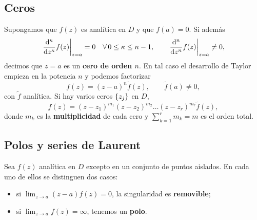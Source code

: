 \subsection{Ceros}
\label{subsec:ceros}

Supongamos que $f(z)$ es anal\'itica en $D$ y que $f(a)=0$. Si adem\'as
\begin{equation}
  \label{eq:cero_orden_n}
  \left. \frac{\mathrm{d}^{\kappa}}{\mathrm{d}z^{\kappa}}f(z) \right|_{z=a}=0
  \quad\forall\,0\le\kappa\le n-1,
  \qquad
  \left. \frac{\mathrm{d}^{n}}{\mathrm{d}z^{n}}f(z) \right|_{z=a}\neq 0,
\end{equation}
decimos que $z=a$ es un \textbf{cero de orden $n$}. En tal caso el desarrollo
de Taylor empieza en la potencia $n$ y podemos factorizar
\begin{equation}
  \label{eq:factorizacion_cero}
  f(z)=(z-a)^n\tilde{f}(z),
  \qquad \tilde{f}(a)\neq 0,
\end{equation}
con $\tilde{f}$ anal\'itica. Si hay varios ceros $\left\{ z_j \right\}$ en $D$,
\begin{equation}
  \label{eq:factorizacion_multiple}
  f(z)=(z-z_1)^{m_1}(z-z_2)^{m_2}\dots(z-z_r)^{m_r}\tilde{f}(z),
\end{equation}
donde $m_k$ es la \textbf{multiplicidad} de cada cero y
$\sum_{k=1}^{r}m_k=m$ es el orden total.

\subsection{Polos y series de Laurent}
\label{subsec:polos_laurent}

Sea $f(z)$ anal\'itica en $D$ excepto en un conjunto de puntos aislados. En
cada uno de ellos se distinguen dos casos:
\begin{itemize}
  \item si $\lim_{z\rightarrow a}(z-a)f(z)=0$, la singularidad es
        \textbf{removible};
  \item si $\lim_{z\rightarrow a}f(z)=\infty$, tenemos un \textbf{polo}.
\end{itemize}

